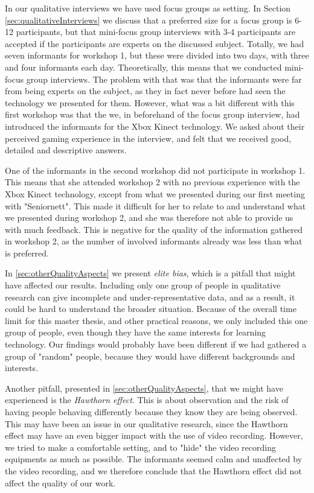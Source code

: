 In our qualitative interviews we have used focus groups as setting. In Section \ref{sec:qualitativeInterviews} we discuss that a preferred size for a focus group is 6-12 participants, but that mini-focus group interviews with 3-4 participants are accepted if the participants are experts on the discussed subject. Totally, we had seven informants for workshop 1, but these were divided into two days, with three and four informants each day. Theoretically, this means that we conducted mini-focus group interviews. The problem with that was that the informants were far from being experts on the subject, as they in fact never before had seen the technology we presented for them. However, what was a bit different with this first workshop was that the we, in beforehand of the focus group interview, had introduced the informants for the Xbox Kinect technology. We asked about their perceived gaming experience in the interview, and felt that we received good, detailed and descriptive answers. 

One of the informants in the second workshop did not participate in workshop 1. This means that she attended workshop 2 with no previous experience with the Xbox Kinect technology, except from what we presented during our first meeting with "Seniornett". This made it difficult for her to relate to and understand what we presented during workshop 2, and she was therefore not able to provide us with much feedback. This is negative for the quality of the information gathered in workshop 2, as the number of involved informants already was less than what is preferred. 

In \ref{sec:otherQualityAspects} we present \emph{elite bias}, which is a pitfall that might have affected our results. Including only one group of people in qualitative research can give incomplete and under-representative data, and as a result, it could be hard to understand the broader situation. Because of the overall time limit for this master thesis, and other practical reasons, we only included this one group of people, even though they have the same interests for learning technology. Our findings would probably have been different if we had gathered a group of "random" people, because they would have different backgrounds and interests.

Another pitfall, presented in \ref{sec:otherQualityAspects}, that we might have experienced  is the \emph{Hawthorn effect}. This is about observation and the risk of having people behaving differently because they know they are being observed. This may have been an issue in our qualitative research, since the Hawthorn effect may have an even bigger impact with the use of video recording. However, we tried to make a comfortable setting, and to "hide" the video recording equipments as much as possible. The informants seemed calm and unaffected by the video recording, and we therefore conclude that the Hawthorn effect did not affect the quality of our work. 

